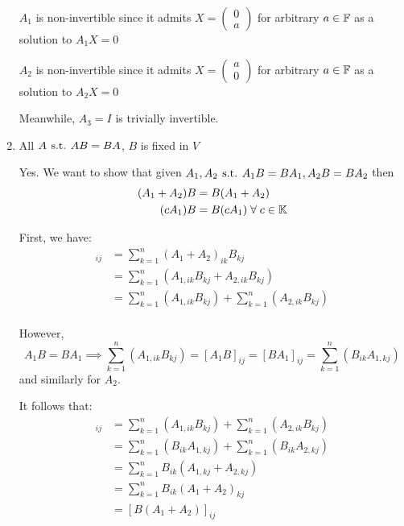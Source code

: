 \documentclass[a4paper, 10pt]{article}
\begin{document}
\begin{solution}
\begin{enumerate}
              \(A_1\) is non-invertible since it admits \(X = \begin{pmatrix}
                      0 \\ a
                  \end{pmatrix}\) for arbitrary \(a \in \mathbb{F}\) as a solution to \(A_1X = 0\)

              \(A_2\) is non-invertible since it admits \(X = \begin{pmatrix}
                      a \\ 0
                  \end{pmatrix}\) for arbitrary \(a \in \mathbb{F}\) as a solution to \(A_2X = 0\)

              Meanwhile, \(A_3 = I\) is trivially invertible.

        \item All \(A \hspace*{4pt}\text{s.t.}\hspace*{4pt} AB = BA\), \(B\) is fixed in \(V\)

              Yes. We want to show that given \(A_1, A_2 \hspace*{4pt}\text{s.t.}\hspace*{4pt} A_1B = BA_1, A_2B = BA_2\) then
              \begin{align*}
                  (A_1 + A_2)B & = B(A_1 + A_2)                 \\
                  (c A_1) B    & = B (c A_1) \forall c \in \bbk
              \end{align*}

              First, we have:
              \begin{align*}
                  [(A_1 + A_2)B]_{ij} & = \sum_{k=1}^{n}(A_1 + A_2)_{ik}B_{kj}                              \\
                                      & = \sum_{k=1}^{n}(A_{1, ik}B_{kj} + A_{2, ik}B_{kj})                 \\
                                      & = \sum_{k=1}^{n}(A_{1, ik}B_{kj}) + \sum_{k=1}^{n}(A_{2, ik}B_{kj}) \\
              \end{align*}

              However, \[
                  A_1B = BA_1 \implies \sum_{k=1}^{n}(A_{1, ik}B_{kj}) = [A_1B]_{ij} = [BA_1]_{ij} = \sum_{k=1}^{n}(B_{ik}A_{1, kj})
              \]
              and similarly for \(A_2\).

              It follows that:
              \begin{align*}
                  [(A_1 + A_2)B]_{ij} & =\sum_{k=1}^{n}(A_{1, ik}B_{kj}) + \sum_{k=1}^{n}(A_{2, ik}B_{kj})  \\
                                      & = \sum_{k=1}^{n}(B_{ik}A_{1, kj}) + \sum_{k=1}^{n}(B_{ik}A_{2, kj}) \\
                                      & = \sum_{k=1}^{n}B_{ik}(A_{1, kj} + A_{2, kj})                       \\
                                      & = \sum_{k=1}^{n}B_{ik}(A_1 + A_2)_{kj}                              \\
                                      & = [B(A_1 + A_2)]_{ij}
              \end{align*}


\end{enumerate}
\end{solution}
\end{document}
